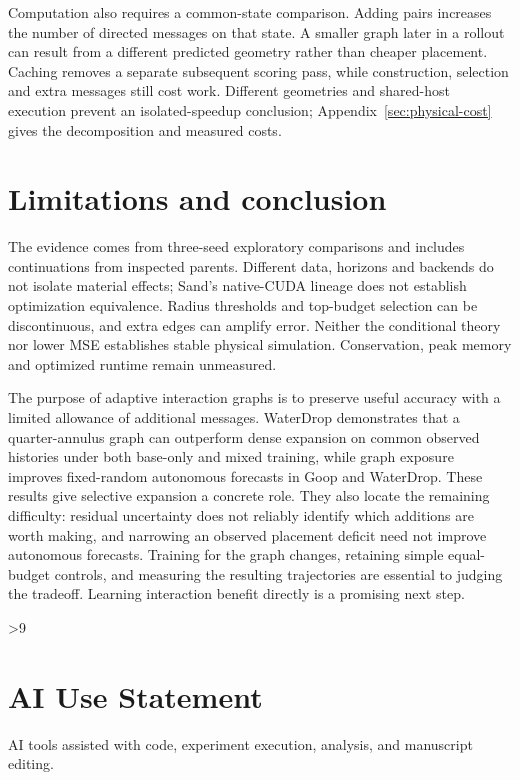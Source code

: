 Computation also requires a common-state comparison. Adding pairs increases the number of directed messages on that state. A smaller graph later in a rollout can result from a different predicted geometry rather than cheaper placement. Caching removes a separate subsequent scoring pass, while construction, selection and extra messages still cost work. Different geometries and shared-host execution prevent an isolated-speedup conclusion; Appendix~\ref{sec:physical-cost} gives the decomposition and measured costs.

\section{Limitations and conclusion}
The evidence comes from three-seed exploratory comparisons and includes continuations from inspected parents. Different data, horizons and backends do not isolate material effects; Sand's native-CUDA lineage does not establish optimization equivalence. Radius thresholds and top-budget selection can be discontinuous, and extra edges can amplify error. Neither the conditional theory nor lower MSE establishes stable physical simulation. Conservation, peak memory and optimized runtime remain unmeasured.

The purpose of adaptive interaction graphs is to preserve useful accuracy with a limited allowance of additional messages. WaterDrop demonstrates that a quarter-annulus graph can outperform dense expansion on common observed histories under both base-only and mixed training, while graph exposure improves fixed-random autonomous forecasts in Goop and WaterDrop. These results give selective expansion a concrete role. They also locate the remaining difficulty: residual uncertainty does not reliably identify which additions are worth making, and narrowing an observed placement deficit need not improve autonomous forecasts. Training for the graph changes, retaining simple equal-budget controls, and measuring the resulting trajectories are essential to judging the tradeoff. Learning interaction benefit directly is a promising next step.

\clearpage
{}
\ifnum\value{page}>9
  \PackageError{research-revision}{Main text exceeds the eight-page limit}{Shorten the main text before submission.}
\fi
\section*{AI Use Statement}
AI tools assisted with code, experiment execution, analysis, and manuscript editing.

